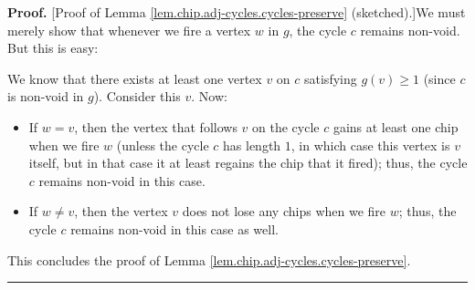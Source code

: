 \documentclass[numbers=enddot,12pt,final,onecolumn,notitlepage]{scrartcl}%
\theoremstyle{definition}
\newenvironment{proof}[1][Proof]{\noindent\textbf{#1.} }{\ \rule{0.5em}{0.5em}}
\begin{document}
\begin{proof}
[Proof of Lemma \ref{lem.chip.adj-cycles.cycles-preserve} (sketched).]We must
merely show that whenever we fire a vertex $w$ in $g$, the cycle $c$ remains
non-void. But this is easy:

We know that there exists at least one vertex $v$ on $c$ satisfying $g\left(
v\right)  \geq1$ (since $c$ is non-void in $g$). Consider this $v$. Now:

\begin{itemize}
\item If $w=v$, then the vertex that follows $v$ on the cycle $c$ gains at
least one chip when we fire $w$ (unless the cycle $c$ has length $1$,
in which case this vertex is $v$ itself, but in that case it at least
regains the chip that it fired);
thus, the cycle $c$ remains non-void in this case.

\item If $w\neq v$, then the vertex $v$ does not lose any chips when we fire
$w$; thus, the cycle $c$ remains non-void in this case as well.
\end{itemize}

This concludes the proof of Lemma \ref{lem.chip.adj-cycles.cycles-preserve}.
\end{proof}
\end{document}
